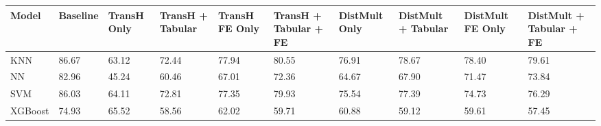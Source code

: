 \begin{tabular}{llllllllll}
\toprule
Model & Baseline & TransH Only & TransH + Tabular & TransH FE Only & TransH + Tabular + FE & DistMult Only & DistMult + Tabular & DistMult FE Only & DistMult + Tabular + FE \\
\midrule
KNN & 86.67 & 63.12 & 72.44 & 77.94 & 80.55 & 76.91 & 78.67 & 78.40 & 79.61 \\
NN & 82.96 & 45.24 & 60.46 & 67.01 & 72.36 & 64.67 & 67.90 & 71.47 & 73.84 \\
SVM & 86.03 & 64.11 & 72.81 & 77.35 & 79.93 & 75.54 & 77.39 & 74.73 & 76.29 \\
XGBoost & 74.93 & 65.52 & 58.56 & 62.02 & 59.71 & 60.88 & 59.12 & 59.61 & 57.45 \\
\bottomrule
\end{tabular}
